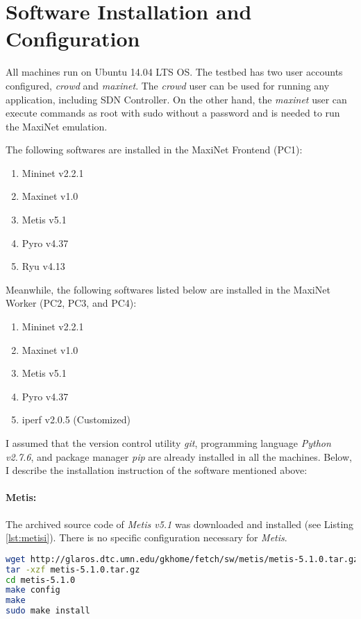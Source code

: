 \section{Software Installation and Configuration}
All machines run on Ubuntu 14.04 LTS OS. The testbed has two user accounts configured, \textit{crowd} and \textit{maxinet}. The \textit{crowd} user can be used for running any application, including SDN Controller. On the other hand, the \textit{maxinet} user can execute commands as root with sudo without a password and is needed to run the MaxiNet emulation.

The following softwares are installed in the MaxiNet Frontend (PC1):

\begin{enumerate}
	\item Mininet v2.2.1
	\item Maxinet v1.0
	\item Metis v5.1
	\item Pyro v4.37
	\item Ryu v4.13
\end{enumerate}

Meanwhile, the following softwares listed below are installed in the MaxiNet Worker (PC2, PC3, and PC4):
\begin{enumerate}
	\item Mininet v2.2.1
	\item Maxinet v1.0
	\item Metis v5.1
	\item Pyro v4.37
	\item iperf v2.0.5 (Customized)
\end{enumerate}

I assumed that the version control utility \textit{git}, programming language \textit{Python v2.7.6}, and package manager \textit{pip} are already installed in all the machines. Below, I describe the installation instruction of the software mentioned above:

\paragraph{Metis:} 
The archived source code of \textit{Metis v5.1} was downloaded and installed (see Listing \ref{lst:metisi}). There is no specific configuration necessary for \textit{Metis}.

\begin{lstlisting}[caption={Metis nstallation},label={lst:metisi},language=bash,tabsize=2,basicstyle=\footnotesize,breaklines=true,showspaces=false,showstringspaces=false,showtabs=false,frame=single]
wget http://glaros.dtc.umn.edu/gkhome/fetch/sw/metis/metis-5.1.0.tar.gz
tar -xzf metis-5.1.0.tar.gz
cd metis-5.1.0
make config
make
sudo make install
\end{lstlisting}

